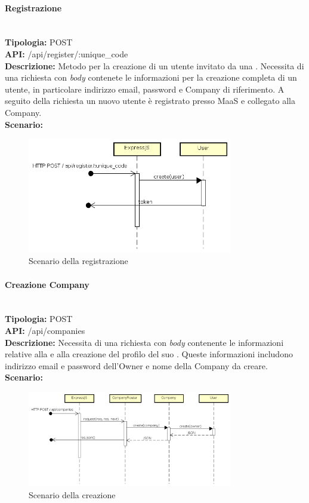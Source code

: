 \paragraph{Registrazione}\mbox{}\\
\textbf{Tipologia:} POST \\
\textbf{API:} /api/register/:unique\_code \\
\textbf{Descrizione:} Metodo per la creazione di un utente invitato da una . Necessita di una richiesta con \textit{body} contenete le informazioni per la creazione completa di un utente, in particolare indirizzo email, password e Company di riferimento. A seguito della richiesta un nuovo utente è registrato presso MaaS e collegato alla Company. \\
\textbf{Scenario:} 
\begin{figure}[H]
\centering
\includegraphics[width=0.8\textwidth]{res/sections/backend/sequence/(POST)register.png}
\caption{Scenario della registrazione}
\end{figure}

\newpage
\paragraph{Creazione Company}\mbox{}\\
\textbf{Tipologia:} POST \\
\textbf{API:} /api/companies \\
\textbf{Descrizione:} Necessita di una richiesta con \textit{body} contenente le informazioni relative alla  e alla creazione del profilo del suo . Queste informazioni includono indirizzo email e password dell'Owner e nome della Company da creare. \\
\textbf{Scenario:} 
\begin{figure}[H]
\centering
\includegraphics[width=0.8\textwidth]{res/sections/backend/sequence/(POST)company.png}
\caption{Scenario della creazione }
\end{figure}

